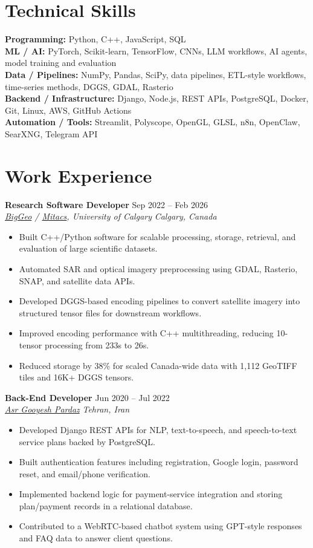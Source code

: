 \documentclass[a4paper,10pt]{article}
\newcommand{\resumeSubheading}[4]{
    \textbf{#1} \hfill #2 \\
    \textit{#3} \hfill \textit{#4}
}
\begin{document}
\section*{Technical Skills}

\textbf{Programming:} Python, C++, JavaScript, SQL \\
\textbf{ML / AI:} PyTorch, Scikit-learn, TensorFlow, CNNs, LLM workflows, AI agents, model training and evaluation \\
\textbf{Data / Pipelines:} NumPy, Pandas, SciPy, data pipelines, ETL-style workflows, time-series methods, DGGS, GDAL, Rasterio \\
\textbf{Backend / Infrastructure:} Django, Node.js, REST APIs, PostgreSQL, Docker, Git, Linux, AWS, GitHub Actions \\
\textbf{Automation / Tools:} Streamlit, Polyscope, OpenGL, GLSL, n8n, OpenClaw, SearXNG, Telegram API


\section*{Work Experience}

\resumeSubheading
{Research Software Developer}
{Sep 2022 -- Feb 2026}
{\href{https://biggeo.com}{BigGeo} / \href{https://www.mitacs.ca/}{Mitacs}, University of Calgary}
{Calgary, Canada}
\begin{itemize}[leftmargin=0.25in]
    \item Built C++/Python software for scalable processing, storage, retrieval, and evaluation of large scientific datasets.
    \item Automated SAR and optical imagery preprocessing using GDAL, Rasterio, SNAP, and satellite data APIs.
    \item Developed DGGS-based encoding pipelines to convert satellite imagery into structured tensor files for downstream workflows.
    \item Improved encoding performance with C++ multithreading, reducing 10-tensor processing from 233s to 26s.
    \item Reduced storage by 38\% for scaled Canada-wide data with 1,112 GeoTIFF tiles and 16K+ DGGS tensors.
\end{itemize}

\resumeSubheading
{Back-End Developer}
{Jun 2020 -- Jul 2022}
{\href{https://asr-gooyesh.com/en/}{Asr Gooyesh Pardaz}}
{Tehran, Iran}
\begin{itemize}[leftmargin=0.25in]
    \item Developed Django REST APIs for NLP, text-to-speech, and speech-to-text service plans backed by PostgreSQL.
    \item Built authentication features including registration, Google login, password reset, and email/phone verification.
    \item Implemented backend logic for payment-service integration and storing plan/payment records in a relational database.
    \item Contributed to a WebRTC-based chatbot system using GPT-style responses and FAQ data to answer client questions.
\end{itemize}
\end{document}
